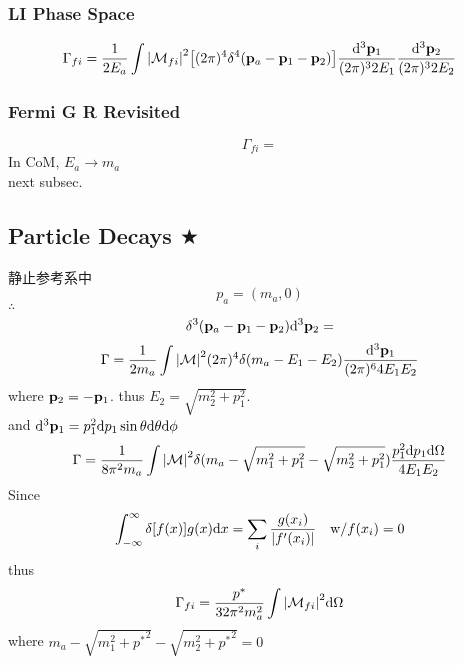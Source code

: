 \documentclass[a4paper]{article}
\DeclareMathOperator{\ra}{\rightarrow}
\DeclareMathOperator{\intdinf}{\int_{-\infty}^\infty}
\numberwithin{equation}{section}
\begin{document}
\subsubsection{LI Phase Space}
\begin{equation}\label{key}
\Gamma_{fi} = \dfrac{1}{2E_a} \int \abs{\mathcal{M}_{fi}}^2\qty[(2\pi)^4\delta^4(\vb{p}_a - \vb{p}_1 - \vb{p}_2)] \dfrac{\dd[3]\vb{p}_1}{(2\pi)^3 2E_1} \dfrac{\dd[3]\vb{p}_2}{(2\pi)^3 2E_2}
\end{equation}

\subsubsection{Fermi G R Revisited}
\begin{equation}\label{key}
\Gamma_{fi} = 
\end{equation}
In CoM, $ E_a \ra m_a $\\
next subsec.

\subsection{Particle Decays $ \bigstar $}


静止参考系中
\begin{equation}\label{key}
p_a = (m_a, 0)
\end{equation}
$ \therefore $
\begin{equation}\label{key}
\delta^3(\vb{p}_a - \vb{p}_1 - \vb{p}_2)\dd[3]\vb{p}_2 = 
\end{equation}
\begin{equation}\label{key}
\Gamma = \dfrac{1}{2m_a} \int \abs{\mathcal{M}}^2 (2\pi)^4 \delta(m_a - E_1 - E_2)\dfrac{\dd[3]\vb{p}_1}{(2\pi)^6 4E_1E_2} 
\end{equation}
where $ \vb{p}_2 = -\vb{p}_1 $. thus $ E_2 = \sqrt{m_2^2 + p_1^2} $.\\
and $ \dd[3]\vb{p}_1 = p_1^2\dd p_1\sin\theta\dd\theta\dd\phi $
\begin{equation}\label{key}
\Gamma = \dfrac{1}{8\pi^2 m_a} \int \abs{\mathcal{M}}^2 \delta(m_a - \sqrt{m_1^2 + p_1^2} - \sqrt{m_2^2 + p_1^2})\dfrac{p_1^2\dd p_1\dd\Omega}{4E_1E_2} 
\end{equation}
Since
\begin{equation}\label{key}
\intdinf \delta[f(x)]g(x)\dd x = \sum_i\dfrac{g(x_i)}{\abs{f'(x_i)}}  \quad \text{w/} f(x_i)=0
\end{equation}
thus
\begin{equation}\label{key}
\Gamma_{fi} = \dfrac{p^*}{32\pi^2 m_a^2} \int \abs{\mathcal{M}_{fi}}^2 \dd\Omega
\end{equation}
where $ m_a - \sqrt{m_1^2 + {p^*}^2} - \sqrt{m_2^2 + {p^*}^2} = 0 $
\end{document}
